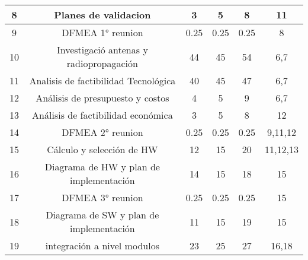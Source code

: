 \begin{table}[H]
\begin{tabular}{|c|c|c|c|c|c|}
8           & Planes de validacion                    & 3                           & 5                 & 8                           & 11                                        \\ \hline
9           & DFMEA 1° reunion                        & 0.25                        & 0.25              & 0.25                        & 8                                         \\ \hline
10          & Investigació antenas y radiopropagación & 44                          & 45                & 54                          & 6,7                                       \\ \hline
11          & Analisis de factibilidad Tecnológica    & 40                          & 45                & 47                          & 6,7                                       \\ \hline
12          & Análisis de presupuesto y costos        & 4                           & 5                 & 9                           & 6,7                                       \\ \hline
13          & Análisis de factibilidad económica      & 3                           & 5                 & 8                           & 12                                        \\ \hline
14          & DFMEA 2° reunion                        & 0.25                        & 0.25              & 0.25                        & 9,11,12                                   \\ \hline
15          & Cálculo y selección de HW               & 12                          & 15                & 20                          & 11,12,13                                  \\ \hline
16          & Diagrama de HW y plan de implementación & 14                          & 15                & 18                          & 15                                        \\ \hline
17          & DFMEA 3° reunion                        & 0.25                        & 0.25              & 0.25                        & 15                                        \\ \hline
18          & Diagrama de SW y plan de implementación & 11                          & 15                & 19                          & 15                                        \\ \hline
19          & integración a nivel modulos             & 23                          & 25                & 27                          & 16,18                                     \\ \hline

\end{tabular}
\end{table}
